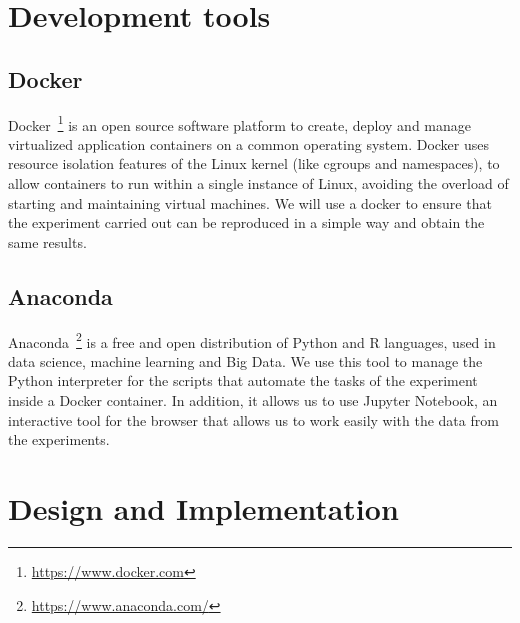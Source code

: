 \section{Development tools}

\subsection{Docker} 

Docker~\footnote{\url{https://www.docker.com}} is an open source software platform to create, deploy and manage virtualized application containers on a common operating system. Docker uses resource isolation features of the Linux kernel (like cgroups and namespaces), to allow containers to run within a single instance of Linux, avoiding the overload of starting and maintaining virtual machines. We will use a docker to ensure that the experiment carried out can be reproduced in a simple way and obtain the same results.

\subsection{Anaconda}

Anaconda~\footnote{\url{https://www.anaconda.com/}} is a free and open distribution of Python and R languages, used in data science, machine learning and Big Data. We use this tool to manage the Python interpreter for the scripts that automate the tasks of the experiment inside a Docker container. In addition, it allows us to use Jupyter Notebook, an interactive tool for the browser that allows us to work easily with the data from the experiments.

\section{Design and Implementation}